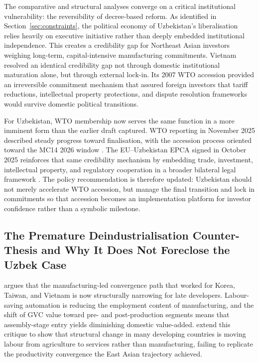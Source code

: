 The comparative and structural analyses converge on a critical institutional vulnerability: the reversibility of decree-based reform. As identified in Section~\ref{sec:constraints}, the political economy of Uzbekistan's liberalisation relies heavily on executive initiative rather than deeply embedded institutional independence. This creates a credibility gap for Northeast Asian investors weighing long-term, capital-intensive manufacturing commitments. Vietnam resolved an identical credibility gap not through domestic institutional maturation alone, but through external lock-in. Its 2007 WTO accession provided an irreversible commitment mechanism that assured foreign investors that tariff reductions, intellectual property protections, and dispute resolution frameworks would survive domestic political transitions.

For Uzbekistan, WTO membership now serves the same function in a more imminent form than the earlier draft captured. WTO reporting in November 2025 described steady progress toward finalisation, with the accession process oriented toward the MC14 2026 window \citep{wto2025uzbekistan}. The EU--Uzbekistan EPCA signed in October 2025 reinforces that same credibility mechanism by embedding trade, investment, intellectual property, and regulatory cooperation in a broader bilateral legal framework \citep{uzbekistan2025epca}. The policy recommendation is therefore updated: Uzbekistan should not merely accelerate WTO accession, but manage the final transition and lock in commitments so that accession becomes an implementation platform for investor confidence rather than a symbolic milestone.

\subsection{The Premature Deindustrialisation Counter-Thesis and Why It Does Not Foreclose the Uzbek Case}

\citet{rodrik2016} argues that the manufacturing-led convergence path that worked for Korea, Taiwan, and Vietnam is now structurally narrowing for late developers. Labour-saving automation is reducing the employment content of manufacturing, and the shift of GVC value toward pre- and post-production segments means that assembly-stage entry yields diminishing domestic value-added. \citet{diao2019} extend this critique to show that structural change in many developing countries is moving labour from agriculture to services rather than manufacturing, failing to replicate the productivity convergence the East Asian trajectory achieved.

